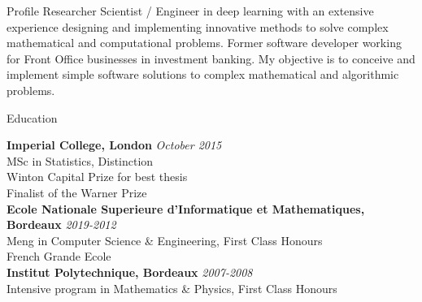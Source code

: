 \documentclass{resume} %
\begin{document}
\begin{rSection}{Profile}
Researcher Scientist / Engineer in deep learning with an extensive experience designing and
implementing innovative methods to solve complex mathematical and computational problems.
Former software developer working for Front Office businesses in investment banking.
My objective is to conceive and implement simple software solutions to complex mathematical and algorithmic problems.

\end{rSection}


\begin{rSection}{Education}

{\bf Imperial College, London} \hfill {\em October 2015} \\ 
MSc in Statistics, Distinction \\
Winton Capital Prize for best thesis \\
Finalist of the Warner Prize \\

{\bf Ecole Nationale Superieure d'Informatique et Mathematiques, Bordeaux} \hfill {\em 2019-2012} \\ 
Meng in Computer Science \& Engineering, First Class Honours \\
French Grande Ecole \\

{\bf Institut Polytechnique, Bordeaux} \hfill {\em 2007-2008} \\ 
Intensive program in Mathematics \& Physics, First Class Honours \\


\end{rSection}

\end{document}

